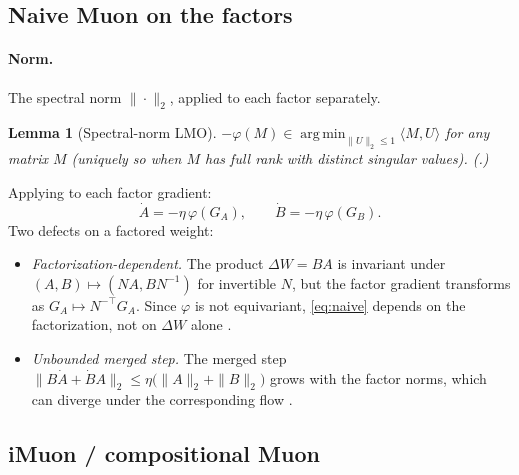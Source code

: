 \documentclass[11pt]{article}
\DeclareMathOperator*{\argmin}{arg\,min}
\newcommand{\DW}{\Delta W}
\newcommand{\polar}{\varphi}                 %
\theoremstyle{plain}
\newtheorem{lemma}{Lemma}
\theoremstyle{definition}
\theoremstyle{remark}
\begin{document}
\subsection{Naive Muon on the factors}
\label{sec:method-naive}
\paragraph{Norm.} The spectral norm $\|\cdot\|_2$, applied to each factor separately.
\begin{lemma}[Spectral-norm LMO]\label{lem:lmo}
$-\polar(M)\in\argmin_{\|U\|_2\le1}\langle M,U\rangle$ for any matrix $M$ (uniquely so when $M$ has full rank with distinct singular values). \emph{(.)}
\end{lemma}
\noindent Applying  to each factor gradient:
\begin{equation}
  \dot A=-\eta\,\polar(G_A),\qquad \dot B=-\eta\,\polar(G_B).
  \label{eq:naive}
\end{equation}
Two defects on a factored weight:
\begin{itemize}[leftmargin=1.5em,itemsep=1pt,topsep=2pt]
  \item \emph{Factorization-dependent.} The product $\DW=BA$ is invariant under $(A,B)\mapsto(NA,BN^{-1})$ for invertible $N$, but the factor gradient transforms as $G_A\mapsto N^{-\top}G_A$. Since $\polar$ is not equivariant, \eqref{eq:naive} depends on the factorization, not on $\DW$ alone \cite{imuon}.
  \item \emph{Unbounded merged step.} The merged step
        $\|B\dot A+\dot B A\|_2\le\eta\big(\|A\|_2+\|B\|_2\big)$
        grows with the factor norms, which can diverge under the corresponding flow \cite{kang_specgf}.
\end{itemize}

\subsection{iMuon / compositional Muon}
\label{sec:method-imuon}
\end{document}
